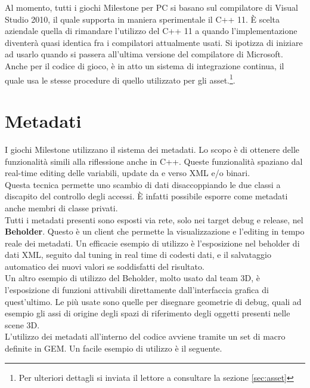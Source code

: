 Al momento, tutti i giochi Milestone per PC si basano sul compilatore di Visual Studio 2010, il quale supporta in maniera sperimentale il C++ 11. È scelta aziendale quella di rimandare l'utilizzo del C++ 11 a quando l'implementazione diventerà quasi identica fra i compilatori attualmente usati. Si ipotizza di iniziare ad usarlo quando si passera all'ultima versione del compilatore di Microsoft.\\

Anche per il codice di gioco, è in atto un sistema di integrazione continua, il quale usa le stesse procedure di quello utilizzato per gli asset.\footnote{Per ulteriori dettagli si inviata il lettore a consultare la sezione \ref{sec:asset}}.

\section{Metadati}

I giochi Milestone utilizzano il sistema dei metadati. Lo scopo è di ottenere delle funzionalità simili alla riflessione anche in C++. Queste funzionalità spaziano dal real-time editing delle variabili, update da e verso XML e/o binari.\\

Questa tecnica permette uno scambio di dati disaccoppiando le due classi a discapito del controllo degli accessi. È infatti possibile esporre come metadati anche membri di classe privati.\\

Tutti i metadati presenti sono esposti via rete, solo nei target debug e release, nel \textbf{Beholder}. Questo è un client che permette la visualizzazione e l'editing in tempo reale dei metadati. Un efficacie esempio di utilizzo è l'esposizione nel beholder di dati XML, seguito dal tuning in real time di codesti dati, e il salvataggio automatico dei nuovi valori se soddisfatti del risultato.\\

Un altro esempio di utilizzo del Beholder, molto usato dal team 3D, è l'esposizione di funzioni attivabili direttamente dall'interfaccia grafica di quest'ultimo. Le più usate sono quelle per disegnare geometrie di debug, quali ad esempio gli assi di origine degli spazi di riferimento degli oggetti presenti nelle scene 3D.\\

L'utilizzo dei metadati all'interno del codice avviene tramite un set di macro definite in GEM. Un facile esempio di utilizzo è il seguente.\\

